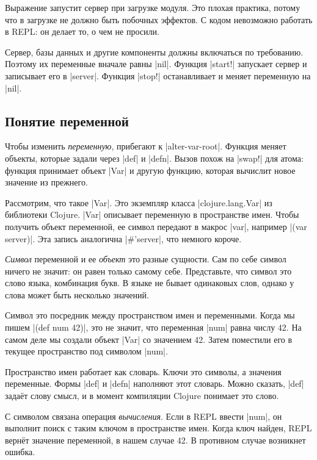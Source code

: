 Выражение запустит сервер при загрузке модуля. Это плохая практика, потому что в
загрузке не должно быть побочных эффектов. С кодом невозможно работать в REPL: он
делает то, о чем не просили.

Сервер, базы данных и другие компоненты должны включаться по требованию. Поэтому
их переменные вначале равны \spverb|nil|. Функция \spverb|start!| запускает
сервер и записывает его в \spverb|server|. Функция \spverb|stop!| останавливает
и меняет переменную на \spverb|nil|.

\subsection{Понятие переменной}

\label{var-section}

Чтобы изменить \emph{переменную}, прибегают к \spverb|alter-var-root|. Функция
меняет объекты, которые задали через \spverb|def| и \spverb|defn|. Вызов похож
на \spverb|swap!| для атома: функция принимает объект \spverb|Var| и другую
функцию, которая вычислит новое значение из прежнего.

Рассмотрим, что такое \spverb|Var|. Это экземпляр класса \spverb|clojure.lang.Var|
из библиотеки Clojure. \spverb|Var| описывает переменную в пространстве имен.
Чтобы получить объект переменной, ее символ передают в макрос \spverb|var|,
например \spverb|(var server)|. Эта запись аналогична \spverb|#'server|,
что немного короче.

\emph{Символ} переменной и ее \emph{объект} это разные сущности. Сам по себе
символ ничего не значит: он равен только самому себе. Представьте, что символ
это слово языка, комбинация букв. В языке не бывает одинаковых слов, однако у
слова может быть несколько значений.

Символ это посредник между пространством имен и переменными. Когда мы пишем
\spverb|(def num 42)|, это не значит, что переменная \spverb|num| равна числу
42. На самом деле мы создали объект \spverb|Var| со значением 42. Затем
поместили его в текущее пространство под символом \spverb|num|.

Пространство имен работает как словарь. Ключи это символы, а значения
переменные. Формы \spverb|def| и \spverb|defn| наполняют этот словарь. Можно
сказать, \spverb|def| зада\"{е}т слову смысл, и в момент компиляции Clojure
понимает это слово.

С символом связана операция \emph{вычисления}. Если в REPL ввести \spverb|num|,
он выполнит поиск с таким ключом в пространстве имен. Когда ключ найден, REPL
верн\"{е}т значение переменной, в нашем случае 42. В противном случае возникнет
ошибка.

